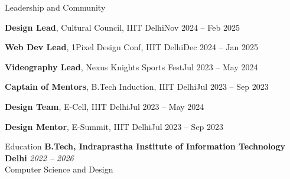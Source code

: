 \documentclass[10pt]{resume}
\begin{document}
\begin{rSection}{Leadership and Community}

\begin{rOthers}{\textbf{Design Lead}, Cultural Council, IIIT Delhi}{Nov 2024 -- Feb 2025}
\end{rOthers}

\begin{rOthers}{\textbf{Web Dev Lead}, 1Pixel Design Conf, IIIT Delhi}{Dec 2024 -- Jan 2025}
\end{rOthers}

\begin{rOthers}{\textbf{Videography Lead}, Nexus Knights Sports Fest}{Jul 2023 -- May 2024}
\end{rOthers}

\begin{rOthers}{\textbf{Captain of Mentors}, B.Tech Induction, IIIT Delhi}{Jul 2023 -- Sep 2023}
\end{rOthers}

\begin{rOthers}{\textbf{Design Team}, E-Cell, IIIT Delhi}{Jul 2023 -- May 2024}
\end{rOthers}

\begin{rOthers}{\textbf{Design Mentor}, E-Summit, IIIT Delhi}{Jul 2023 -- Sep 2023}
\end{rOthers}

\end{rSection}

\begin{rSection}{Education}
\textbf{B.Tech, Indraprastha Institute of Information Technology Delhi} \hfill \textit{2022 -- 2026} \\
Computer Science and Design
\end{rSection}
\end{document}
